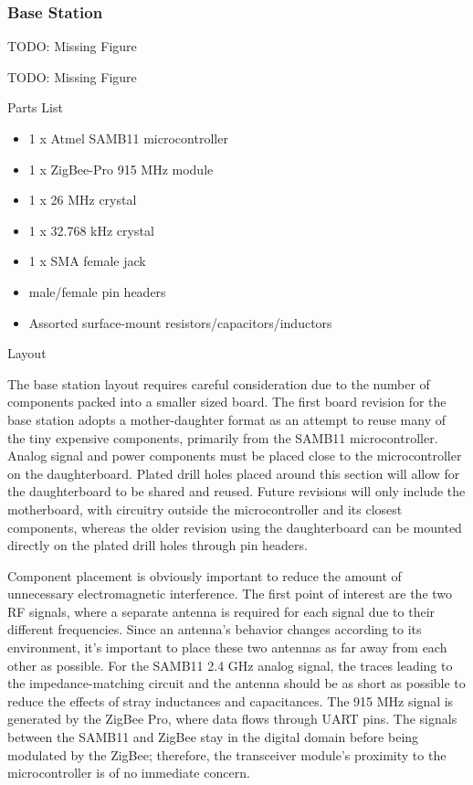 \documentclass[journal]{IEEEtran}
\begin{document}
\subsubsection{Base Station}

TODO: Missing Figure

TODO: Missing Figure

Parts List
\begin{itemize}
  \item 1 x Atmel SAMB11 microcontroller
  \item 1 x ZigBee-Pro 915 MHz module
  \item 1 x 26 MHz crystal
  \item 1 x 32.768 kHz crystal
  \item 1 x SMA female jack
  \item male/female pin headers
  \item Assorted surface-mount resistors/capacitors/inductors
\end{itemize}

Layout

The base station layout requires careful consideration due to the number of components packed into a smaller sized board.  The first board revision for the base station adopts a mother-daughter format as an attempt to reuse many of the tiny expensive components, primarily from the SAMB11 microcontroller.  Analog signal and power components must be placed close to the microcontroller on the daughterboard.  Plated drill holes placed around this section will allow for the daughterboard to be shared and reused.  Future revisions will only include the motherboard, with circuitry outside the microcontroller and its closest components, whereas the older revision using the daughterboard can be mounted directly on the plated drill holes through pin headers.

Component placement is obviously important to reduce the amount of unnecessary electromagnetic interference.  The first point of interest are the two RF signals, where a separate antenna is required for each signal due to their different frequencies.  Since an antenna’s behavior changes according to its environment, it’s important to place these two antennas as far away from each other as possible.  For the SAMB11 2.4 GHz analog signal, the traces leading to the impedance-matching circuit and the antenna should be as short as possible to reduce the effects of stray inductances and capacitances.  The 915 MHz signal is generated by the ZigBee Pro, where data flows through UART pins.  The signals between the SAMB11 and ZigBee stay in the digital domain before being modulated by the ZigBee;  therefore, the transceiver module’s proximity to the microcontroller is of no immediate concern.
\end{document}
